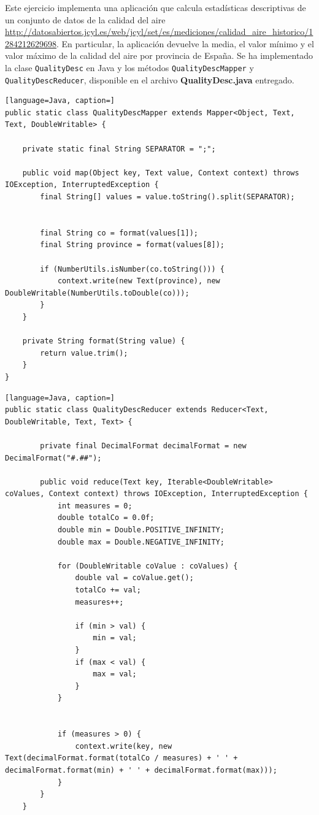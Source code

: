 \documentclass[10pt,swedish, openany]{book}
\begin{document}
Este ejercicio implementa una aplicación que calcula estadísticas descriptivas de un conjunto de datos de la calidad del aire \url{http://datosabiertos.jcyl.es/web/jcyl/set/es/mediciones/calidad_aire_historico/1284212629698}. En particular, la aplicación devuelve la media, el valor mínimo y el valor máximo de la calidad del aire por provincia de España. Se ha implementado la clase \texttt{QualityDesc} en Java y los métodos \texttt{QualityDescMapper} y \texttt{QualityDescReducer}, disponible en el archivo \textbf{QualityDesc.java} entregado. 
\begin{lstlisting}[language=Java, caption=]
public static class QualityDescMapper extends Mapper<Object, Text, Text, DoubleWritable> {

	private static final String SEPARATOR = ";";

	public void map(Object key, Text value, Context context) throws IOException, InterruptedException {
		final String[] values = value.toString().split(SEPARATOR);


		final String co = format(values[1]);
		final String province = format(values[8]);

		if (NumberUtils.isNumber(co.toString())) {
			context.write(new Text(province), new DoubleWritable(NumberUtils.toDouble(co)));
		}
	}

	private String format(String value) {
		return value.trim();
	}
}
\end{lstlisting}
\begin{lstlisting}[language=Java, caption=]
public static class QualityDescReducer extends Reducer<Text, DoubleWritable, Text, Text> {

		private final DecimalFormat decimalFormat = new DecimalFormat("#.##");

		public void reduce(Text key, Iterable<DoubleWritable> coValues, Context context) throws IOException, InterruptedException {
			int measures = 0;
			double totalCo = 0.0f;
			double min = Double.POSITIVE_INFINITY;
			double max = Double.NEGATIVE_INFINITY;

			for (DoubleWritable coValue : coValues) {
				double val = coValue.get();
				totalCo += val;
				measures++;

				if (min > val) {
					min = val;
				}
				if (max < val) {
					max = val;				
				}
			}
			

			if (measures > 0) {
				context.write(key, new Text(decimalFormat.format(totalCo / measures) + ' ' + decimalFormat.format(min) + ' ' + decimalFormat.format(max)));
			}
		}
	}
\end{lstlisting}
\end{document}
